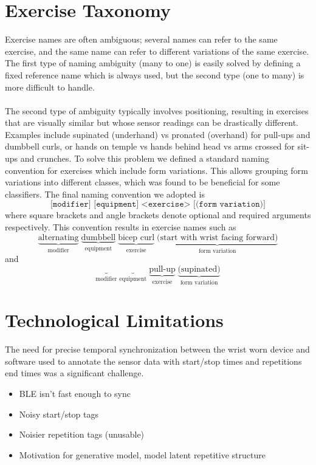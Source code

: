\documentclass[12pt]{report}
\newcommand{\m}[1]{\texttt{#1}}
\newcommand{\1}[0]{\mathbbm{1}}
\begin{document}
\section{Exercise Taxonomy}
Exercise names are often ambiguous; several names can refer to the same exercise, 
and the same name can refer to different variations of the same exercise. 
The first type of naming ambiguity (many to one) is easily solved by defining a fixed reference name 
which is always used, but the second type (one to many) is more difficult to handle. 
\\\\
The second type of ambiguity typically involves positioning, resulting in exercises that are visually similar
but whose sensor readings can be drastically different. 
Examples include supinated (underhand) vs pronated (overhand) for pull-ups and dumbbell curls,
or hands on temple vs hands behind head vs arms crossed for sit-ups and crunches. To solve this problem 
we defined a standard naming convention for exercises which include form variations. This allows grouping
form variations into different classes, which was found to be beneficial for some classifiers. 
The final naming convention we adopted is
\[
    \m{[modifier] [equipment] <exercise> [(form variation)]}
\]
where square brackets and angle brackets denote optional and required arguments respectively. 
This convention results in exercise names such as
\[
    \underbrace{\text{alternating}}_{\text{modifier}} \; \underbrace{\text{dumbbell}}_{\text{equipment}} \; \underbrace{\text{bicep curl}}_{\text{exercise}} \; \underbrace{\text{(start with wrist facing forward)}}_{\text{form variation}}
\]
and
\[
    \underbrace{}_{\text{modifier}} \; \underbrace{}_{\text{equipment}} \; \underbrace{\text{pull-up}}_{\text{exercise}} \; \underbrace{\text{(supinated)}}_{\text{form variation}}
\]

\section{Technological Limitations}
The need for precise temporal synchronization between the wrist worn device and software
used to annotate the sensor data with start/stop times and repetitions end times was a significant
challenge.
\begin{itemize}
    \item BLE isn't fast enough to sync
    \item Noisy start/stop tags
    \item Noisier repetition tags (unusable)
    \item Motivation for generative model, model latent repetitive structure
\end{itemize}
\end{document}
